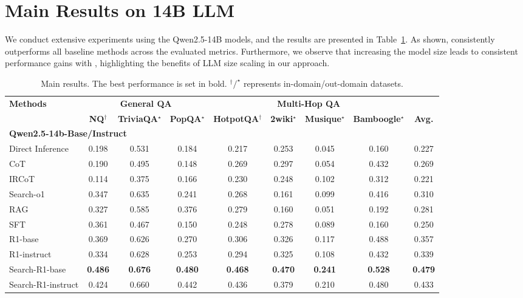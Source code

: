 \section{Main Results on 14B LLM}\label{apx:sec:largerllm}

We conduct extensive experiments using the Qwen2.5-14B models, and the results are presented in Table~\ref{apx:tab:largerllm}. As shown, \Ours consistently outperforms all baseline methods across the evaluated metrics. Furthermore, we observe that increasing the model size leads to consistent performance gains with \Ours, highlighting the benefits of LLM size scaling in our approach.

\begin{table}[h]
    \centering
    \scriptsize
    \setlength{\tabcolsep}{4pt}
    
    \caption{Main results. The best performance is set in bold. $^\dagger/^\star$ represents in-domain/out-domain datasets.}\label{apx:tab:largerllm}
    \begin{tabular}{lcccccccc}
        \toprule
        \textbf{Methods} & \multicolumn{3}{c}{\textbf{General QA}} & \multicolumn{4}{c}{\textbf{Multi-Hop QA}} \\
        \cmidrule{2-9}
         & \textbf{NQ$^\dagger$} & \textbf{TriviaQA$^\star$} & \textbf{PopQA$^\star$} & \textbf{HotpotQA$^\dagger$} & \textbf{2wiki$^\star$} & \textbf{Musique$^\star$} & \textbf{Bamboogle$^\star$} & \textbf{Avg.} \\
        \midrule
        \multicolumn{8}{l}{\textbf{Qwen2.5-14b-Base/Instruct}} \\
        Direct Inference & 0.198 & 0.531 & 0.184 & 0.217 & 0.253 & 0.045 & 0.160 & 0.227 \\
        CoT & 0.190 & 0.495 & 0.148 & 0.269 & 0.297 & 0.054 & 0.432 & 0.269 \\
        IRCoT & 0.114 & 0.375 & 0.166 & 0.230 & 0.248 & 0.102 & 0.312 & 0.221 \\
        Search-o1 & 0.347 & 0.635 & 0.241 & 0.268 & 0.161 & 0.099 & 0.416 & 0.310 \\
        RAG & 0.327 & 0.585 & 0.376 & 0.279 & 0.160 & 0.051 & 0.192 & 0.281 \\
        SFT & 0.361 & 0.467 & 0.150 & 0.248 & 0.278 & 0.089 & 0.160 & 0.250 \\
        R1-base & 0.369 & 0.626 & 0.270 & 0.306 & 0.326 & 0.117 & 0.488 & 0.357 \\
        R1-instruct & 0.334 & 0.628 & 0.253 & 0.294 & 0.325 & 0.108 & 0.432 & 0.339  \\
        \hdashline
        Search-R1-base &  \textbf{0.486} & \textbf{0.676} & \textbf{0.480} & \textbf{0.468} & \textbf{0.470} & \textbf{0.241} & \textbf{0.528} & \textbf{0.479} \\
        Search-R1-instruct & 0.424 & 0.660 & 0.442 & 0.436 & 0.379 & 0.210 & 0.480 & 0.433  \\
        
        \bottomrule
    \end{tabular}
\end{table}

